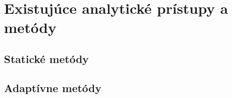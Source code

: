 \chapter{Existujúce analytické prístupy a metódy}
\label{Existujúce analytické prístupy a metódy} 

\section{Statické metódy}


\section{Adaptívne metódy}